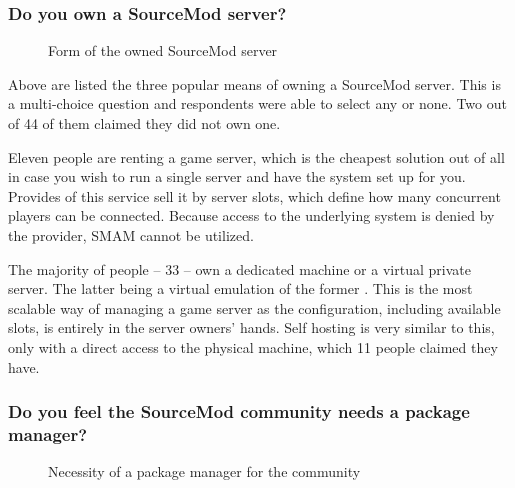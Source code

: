 \subsubsection{Do you own a SourceMod server?}

\begin{figure}[H]
  \centering
  \caption{Form of the owned SourceMod server}
  \label{fig:form-of-the-owned-sourcemod-server}
\end{figure}

Above are listed the three popular means of owning a SourceMod server.
This is a multi-choice question and respondents were able to select any or none.
Two out of 44 of them claimed they did not own one.

Eleven people are renting a game server, which is the cheapest solution out of all in case you wish to run a single server and have the system set up for you.
Provides of this service sell it by server slots, which define how many concurrent players can be connected.
Because access to the underlying system is denied by the provider, SMAM cannot be utilized.

The majority of people -- 33 -- own a dedicated machine or a virtual private server.
The latter being a virtual emulation of the former \cite{vps-explained}.
This is the most scalable way of managing a game server as the configuration, including available slots, is entirely in the server owners' hands.
Self hosting is very similar to this, only with a direct access to the physical machine, which 11 people claimed they have.

\subsubsection{Do you feel the SourceMod community needs a package manager?}

\begin{figure}[H]
  \centering
  \caption{Necessity of a package manager for the community}
  \label{fig:necessity-of-a-package-manager-for-the-community}
\end{figure}

